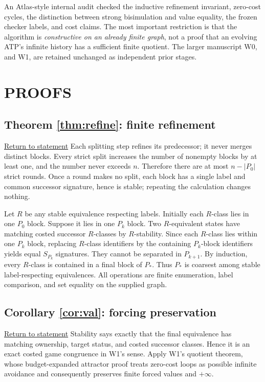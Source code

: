 \documentclass[11pt,letterpaper]{article}
\theoremstyle{definition}
\theoremstyle{remark}
\newcommand{\backstatement}[1]{\hyperlink{stmt:#1}{\footnotesize Return to statement}}
\begin{document}
An Atlas-style internal audit checked the inductive refinement invariant, zero-cost cycles, the distinction between strong bisimulation and value equality, the frozen checker labels, and cost claims. The most important restriction is that the algorithm is \emph{constructive on an already finite graph}, not a proof that an evolving ATP's infinite history has a sufficient finite quotient. The larger manuscript W0, and W1, are retained unchanged as independent prior stages.

\section{PROOFS}
\hypertarget{proof:refine}{}\subsection*{Theorem \ref{thm:refine}: finite refinement} \backstatement{refine}
Each splitting step refines its predecessor; it never merges distinct blocks. Every strict split increases the number of nonempty blocks by at least one, and the number never exceeds $n$. Therefore there are at most $n-|P_0|$ strict rounds. Once a round makes no split, each block has a single label and common successor signature, hence is stable; repeating the calculation changes nothing.

Let $R$ be any stable equivalence respecting labels. Initially each $R$-class lies in one $P_0$ block. Suppose it lies in one $P_k$ block. Two $R$-equivalent states have matching costed successor $R$-classes by $R$-stability. Since each $R$-class lies within one $P_k$ block, replacing $R$-class identifiers by the containing $P_k$-block identifiers yields equal $S_{P_k}$ signatures. They cannot be separated in $P_{k+1}$. By induction, every $R$-class is contained in a final block of $P_*$. Thus $P_*$ is coarsest among stable label-respecting equivalences. All operations are finite enumeration, label comparison, and set equality on the supplied graph.

\hypertarget{proof:val}{}\subsection*{Corollary \ref{cor:val}: forcing preservation} \backstatement{val}
Stability says exactly that the final equivalence has matching ownership, target status, and costed successor classes. Hence it is an exact costed game congruence in W1's sense. Apply W1's quotient theorem, whose budget-expanded attractor proof treats zero-cost loops as possible infinite avoidance and consequently preserves finite forced values and $+\infty$.
\end{document}

